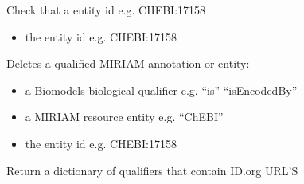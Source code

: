 \documentclass[letterpaper,10pt,english]{sphinxmanual}
\begin{document}
\begin{fulllineitems}
\begin{fulllineitems}
\label{\detokenize{modules_doc:cbmpy.CBCommon.MIRIAMannotation.checkId}}
\pysigstartsignatures
{}
\pysigstopsignatures
\sphinxAtStartPar
Check that a entity id e.g. CHEBI:17158
\begin{itemize}
\item {} 
\sphinxAtStartPar
{} the entity id e.g. CHEBI:17158

\end{itemize}

\end{fulllineitems}


\begin{fulllineitems}
\label{\detokenize{modules_doc:cbmpy.CBCommon.MIRIAMannotation.deleteMIRIAMannotation}}
\pysigstartsignatures
{}
\pysigstopsignatures
\sphinxAtStartPar
Deletes a qualified MIRIAM annotation or entity:
\begin{itemize}
\item {} 
\sphinxAtStartPar
{} a Biomodels biological qualifier e.g. “is” “isEncodedBy”

\item {} 
\sphinxAtStartPar
{} a MIRIAM resource entity e.g. “ChEBI”

\item {} 
\sphinxAtStartPar
{} the entity id e.g. CHEBI:17158

\end{itemize}

\end{fulllineitems}


\begin{fulllineitems}
\label{\detokenize{modules_doc:cbmpy.CBCommon.MIRIAMannotation.getAllMIRIAMUris}}
\pysigstartsignatures
{}
\pysigstopsignatures
\sphinxAtStartPar
Return a dictionary of qualifiers that contain ID.org URL’S


\end{fulllineitems}
\end{fulllineitems}
\end{document}
